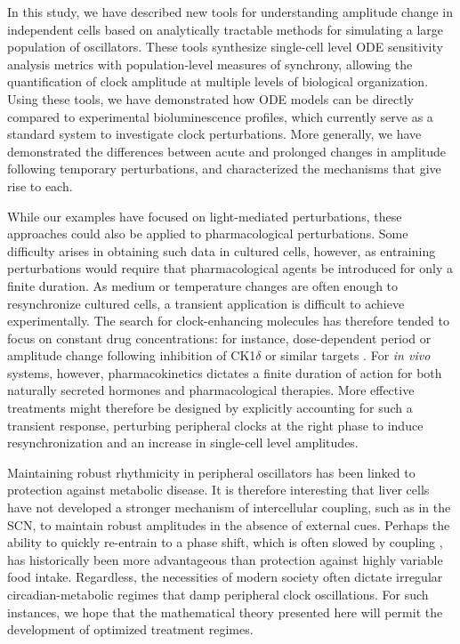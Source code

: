 \documentclass[11pt, letterpaper]{article}
\begin{document}
In this study, we have described new tools for understanding amplitude change in independent cells based on analytically tractable methods for simulating a large population of oscillators.
These tools synthesize single-cell level ODE sensitivity analysis metrics with population-level measures of synchrony, allowing the quantification of clock amplitude at multiple levels of biological organization.
Using these tools, we have demonstrated how ODE models can be directly compared to experimental bioluminescence profiles, which currently serve as a standard system to investigate clock perturbations.
More generally, we have demonstrated the differences between acute and prolonged changes in amplitude following temporary perturbations, and characterized the mechanisms that give rise to each.

While our examples have focused on light-mediated perturbations, these approaches could also be applied to pharmacological perturbations.
Some difficulty arises in obtaining such data in cultured cells, however, as entraining perturbations would require that pharmacological agents be introduced for only a finite duration.
As medium or temperature changes are often enough to resynchronize cultured cells, a transient application is difficult to achieve experimentally.
The search for clock-enhancing molecules has therefore tended to focus on constant drug concentrations: for instance, dose-dependent period or amplitude change following inhibition of CK1$\delta$ or similar targets \cite{Chen2013}.
For {\itshape in vivo} systems, however, pharmacokinetics dictates a finite duration of action for both naturally secreted hormones and pharmacological therapies.
More effective treatments might therefore be designed by explicitly accounting for such a transient response, perturbing peripheral clocks at the right phase to induce resynchronization and an increase in single-cell level amplitudes.

Maintaining robust rhythmicity in peripheral oscillators has been linked to protection against metabolic disease.
It is therefore interesting that liver cells have not developed a stronger mechanism of intercellular coupling, such as in the SCN, to maintain robust amplitudes in the absence of external cues.
Perhaps the ability to quickly re-entrain to a phase shift, which is often slowed by coupling \cite{Abraham2010}, has historically been more advantageous than protection against highly variable food intake.
Regardless, the necessities of modern society often dictate irregular circadian-metabolic regimes that damp peripheral clock oscillations.
For such instances, we hope that the mathematical theory presented here will permit the development of optimized treatment regimes.
\end{document}
